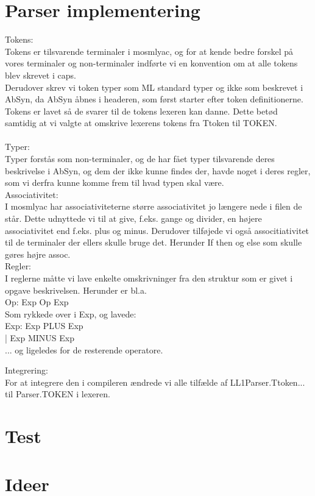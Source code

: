 \documentclass[11pt,a4paper]{article}
\begin{document}
\section*{Parser implementering}
Tokens:\\
Tokens er tilsvarende terminaler i mosmlyac, og for at kende bedre forskel på vores terminaler og non-terminaler indførte vi en konvention om at alle tokens blev skrevet i caps.\\
Derudover skrev vi token typer som ML standard typer og ikke som beskrevet i AbSyn, da AbSyn åbnes i headeren, som først starter efter token definitionerne.\\
Tokens er lavet så de svarer til de tokens lexeren kan danne. Dette betød samtidig at vi valgte at omskrive lexerens tokens fra Ttoken til TOKEN.\\
\\
Typer:\\
Typer forstås som non-terminaler, og de har fået typer tilsvarende deres beskrivelse i AbSyn, og dem der ikke kunne findes der, havde noget i deres regler, som vi derfra kunne komme frem til hvad typen skal være.
\\
Associativitet:\\
I mosmlyac har associativiteterne større associativitet jo længere nede i filen de står. Dette udnyttede vi til at give, f.eks. gange og divider, en højere associativitet end f.eks. plus og minus. Derudover tilføjede vi også associtiativitet til de terminaler der ellers skulle bruge det. Herunder If then og else som skulle gøres højre assoc.\\
Regler:\\
I reglerne måtte vi lave enkelte omskrivninger fra den struktur som er givet i opgave beskrivelsen. Herunder er bl.a. \\
Op: Exp Op Exp\\
Som rykkede over i Exp, og lavede:\\
Exp: Exp PLUS Exp\\
   | Exp MINUS Exp\\
... og ligeledes for de resterende operatore.

Integrering:\\
For at integrere den i compileren ændrede vi alle tilfælde af LL1Parser.Ttoken... til Parser.TOKEN i lexeren.



\section*{Test}

\section*{Ideer}
\end{document}
